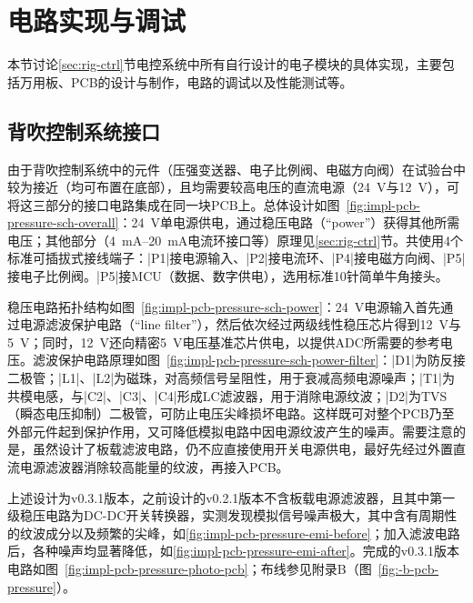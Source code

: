\clearpage



\section{电路实现与调试}\label{sec:impl-pcb}

本节讨论\ref{sec:rig-ctrl}节电控系统中所有自行设计的电子模块的具体实现，主要包括万用板、PCB的设计与制作，电路的调试以及性能测试等。


\subsection{背吹控制系统接口}\label{sec:impl-pcb-pressure}

由于背吹控制系统中的元件（压强变送器、电子比例阀、电磁方向阀）在试验台中较为接近（均可布置在底部），且均需要较高电压的直流电源（\SI{+24}{\V}与\SI{+12}{\V}），可将这三部分的接口电路集成在同一块PCB上。总体设计如图~\ref{fig:impl-pcb-pressure-sch-overall}：\SI{+24}{\V}单电源供电，通过稳压电路（``power''）获得其他所需电压；其他部分（\SIrange{4}{20}{\mA}电流环接口等）原理见\ref{sec:rig-ctrl}节。共使用4个标准可插拔式接线端子：\bverb|P1|接电源输入、\bverb|P2|接电流环、\bverb|P4|接电磁方向阀、\bverb|P5|接电子比例阀。\bverb|P5|接MCU（数据、数字供电），选用标准10针简单牛角接头。

稳压电路拓扑结构如图~\ref{fig:impl-pcb-pressure-sch-power}：\SI{+24}{\V}电源输入首先通过电源滤波保护电路（``line filter''），然后依次经过两级线性稳压芯片得到\SI{+12}{\V}与\SI{+5}{\V}；同时，\SI{+12}{\V}还向精密\SI{+5}{\V}电压基准芯片供电，以提供ADC所需要的参考电压。滤波保护电路原理如图~\ref{fig:impl-pcb-pressure-sch-power-filter}：\bverb|D1|为防反接二极管；\bverb|L1|、\bverb|L2|为磁珠，对高频信号呈阻性，用于衰减高频电源噪声；\bverb|T1|为共模电感，与\bverb|C2|、\bverb|C3|、\bverb|C4|形成LC滤波器，用于消除电源纹波；\bverb|D2|为TVS（瞬态电压抑制）二极管，可防止电压尖峰损坏电路。这样既可对整个PCB乃至外部元件起到保护作用，又可降低模拟电路中因电源纹波产生的噪声。需要注意的是，虽然设计了板载滤波电路，仍不应直接使用开关电源供电，最好先经过外置直流电源滤波器消除较高能量的纹波，再接入PCB。

上述设计为v0.3.1版本，之前设计的v0.2.1版本不含板载电源滤波器，且其中第一级稳压电路为DC-DC开关转换器，实测发现模拟信号噪声极大，其中含有周期性的纹波成分以及频繁的尖峰，如\ref{fig:impl-pcb-pressure-emi-before}；加入滤波电路后，各种噪声均显著降低，如\ref{fig:impl-pcb-pressure-emi-after}。完成的v0.3.1版本电路如图~\ref{fig:impl-pcb-pressure-photo-pcb}；布线参见附录B（图~\ref{fig:-b-pcb-pressure}）。

